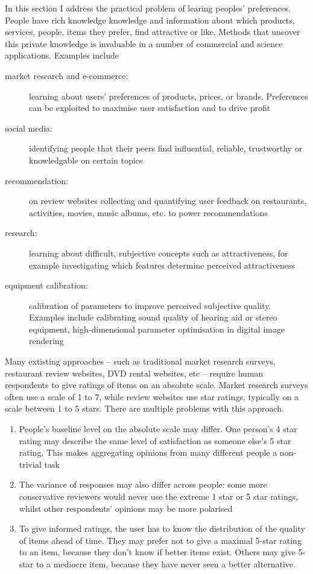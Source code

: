 In this section I address the practical problem of learing peoples' preferences. People have rich knowledge knowledge and information about which products, services, people, items they prefer, find attractive or like. Methods that uncover this private knowledge is invaluable in a number of commercial and science applications. Examples include
\begin{description}
	\item [market research and e-commerce:] learning about users' preferences of products, prices, or brands. Preferences can be exploited to maximise user satisfaction and to drive profit
	\item [social media:] identifying people that their peers find influential, reliable, trustworthy or knowledgable on certain topics
	\item [recommendation:] on review websites collecting and quantifying user feedback on restaurants, activities, movies, music albums, etc. to power recommendations
	\item [research:] learning about difficult, subjective concepts such as attractiveness, for example investigating which features determine perceived attractiveness
	\item [equipment calibration:] calibration of parameters to improve perceived subjective quality. Examples include calibrating sound quality of hearing aid or stereo equipment, high-dimensional parameter optimisation in digital image rendering
\end{description}

Many extisting approaches -- such as traditional market research surveys, restaurant review websites, DVD rental websites, etc -- require human respondents to give ratings of items on an absolute scale. Market research surveys often use a scale of 1 to 7, while review websites use star ratings, typically on a scale between 1 to 5 stars. There are multiple problems with this approach.
\begin{enumerate}
	\item People's baseline level on the absolute scale may differ. One person's 4 star rating may describe the same level of satisfaction as someone else's 5 star rating. This makes aggregating opinions from many different people a non-trivial task
	\item The variance of responses may also differ across people: some more conservative reviewers would never use the extreme 1 star or 5 star ratings, whilst other respondents' opinions may be more polarised
	\item To give informed ratings, the user has to know the distribution of the quality of items ahead of time. They may prefer not to give a maximal 5-star rating to an item, because they don't know if better items exist. Others may give 5-star to a mediocre item, because they have never seen a better alternative.
\end{enumerate} 

